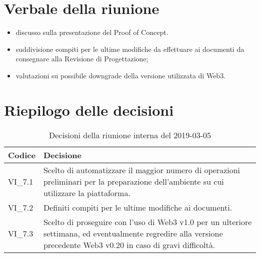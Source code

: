 \section{Verbale della riunione}
\begin{itemize}
	\item discusso sulla presentazione del Proof of Concept.
	\item suddivisione compiti per le ultime modifiche da effettuare ai 
	documenti 
	da consegnare alla Revisione di Progettazione;
	\item valutazioni su possibile downgrade della versione utilizzata di Web3.
	
\end{itemize}

\hspace{3cm}

\section{Riepilogo delle decisioni}

	
	\begin{longtable}{ >{\centering}p{} >{}p{}}
		\caption{Decisioni della riunione interna del 2019-03-05}\\	
		\rowcolorhead
		\textbf{\color{white}Codice} 
		& \centering\textbf{\color{white}Decisione} 
		\tabularnewline 
		\endfirsthead
		VI\_7.1 & Scelto di automatizzare il maggior numero di operazioni 
		preliminari per la preparazione dell'ambiente su cui utilizzare la 
		piattaforma.
		\tabularnewline 
		VI\_7.2 & Definiti compiti per le ultime modifiche ai documenti.
		\tabularnewline 
		VI\_7.3 & Scelto di proseguire con l'uso di Web3 v1.0 per un ulteriore settimana, ed eventualmente regredire alla versione precedente Web3 v0.20 in caso di gravi difficoltà.	
	\end{longtable}
	





